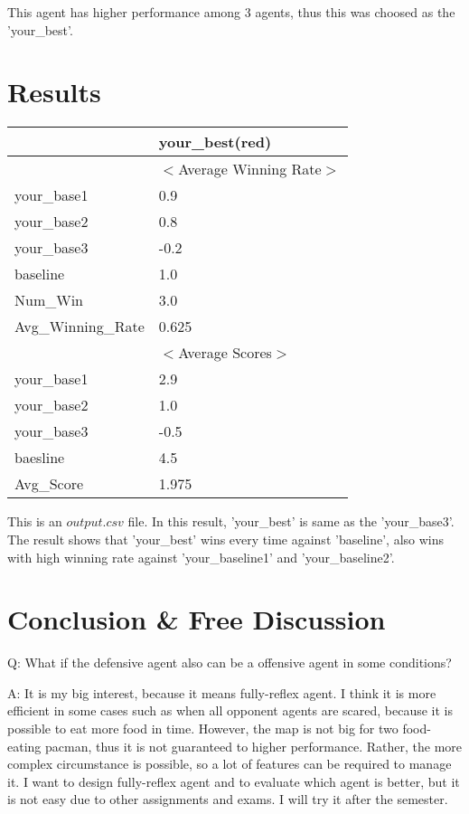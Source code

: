 \documentclass{article}
\theoremstyle{plain}
\theoremstyle{definition}
\theoremstyle{remark}
\begin{document}
This agent has higher performance among 3 agents, thus this was choosed as the 'your\_best'.

\section{Results}

\begin{table}[!ht]
    \centering
    \begin{tabular}{|l|l|}
    \hline
        ~ & your\_best(red) \\ \hline
        ~ & $<$Average Winning Rate$>$ \\ \hline
        your\_base1 & 0.9 \\ \hline
        your\_base2 & 0.8 \\ \hline
        your\_base3 & -0.2 \\ \hline
        baseline & 1.0 \\ \hline
        Num\_Win & 3.0 \\ \hline
        Avg\_Winning\_Rate & 0.625 \\ \hline
        ~ & $<$Average Scores$>$ \\ \hline
        your\_base1 & 2.9 \\ \hline
        your\_base2 & 1.0 \\ \hline
        your\_base3 & -0.5 \\ \hline
        baesline & 4.5 \\ \hline
        Avg\_Score & 1.975 \\ \hline
    \end{tabular}
\end{table}

This is an $output.csv$ file. In this result, 'your\_best' is same as the 'your\_base3'. The result shows that 'your\_best' wins every time against 'baseline', also wins with high winning rate against 'your\_baseline1' and 'your\_baseline2'.

\section{Conclusion \& Free Discussion}

Q: What if the defensive agent also can be a offensive agent in some conditions?

A: It is my big interest, because it means fully-reflex agent. I think it is more efficient in some cases such as when all opponent agents are scared, because it is possible to eat more food in time. However, the map is not big for two food-eating pacman, thus it is not guaranteed to higher performance. Rather, the more complex circumstance is possible, so a lot of features can be required to manage it. I want to design fully-reflex agent and to evaluate which agent is better, but it is not easy due to other assignments and exams. I will try it after the semester.
\end{document}
